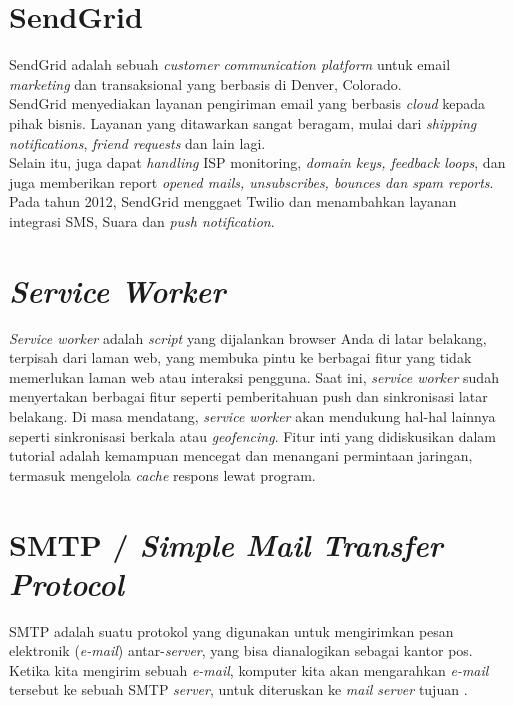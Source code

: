 	\section{  SendGrid}
	SendGrid adalah sebuah \textit{customer communication platform} untuk email \textit{marketing} dan transaksional yang berbasis di Denver, Colorado.
	\\ \indent
	SendGrid menyediakan layanan pengiriman email yang berbasis \textit{cloud} kepada pihak bisnis. Layanan yang ditawarkan sangat beragam, mulai dari \textit{shipping notifications}, \textit{friend requests} dan lain lagi. \\ \indent
	Selain itu, juga dapat \textit{handling} ISP monitoring, \textit{domain keys, feedback loops}, dan juga memberikan report \textit{opened mails, unsubscribes, bounces dan spam reports}. Pada tahun 2012, SendGrid menggaet Twilio dan menambahkan layanan integrasi SMS, Suara dan \textit{push notification}. \cite{wikipedia_sendgrid_2017}
	
	\section{  \textit{Service Worker}}
	\textit{Service worker }adalah \textit{script} yang dijalankan browser Anda di latar belakang, terpisah dari laman web, yang membuka pintu ke berbagai fitur yang tidak memerlukan laman web atau interaksi pengguna. Saat ini, \textit{service worker} sudah menyertakan berbagai fitur seperti pemberitahuan push dan sinkronisasi latar belakang. Di masa mendatang, \textit{service worker} akan mendukung hal-hal lainnya seperti sinkronisasi berkala atau \textit{geofencing}. Fitur inti yang didiskusikan dalam tutorial adalah kemampuan mencegat dan menangani permintaan jaringan, termasuk mengelola \textit{cache} respons lewat program\cite{google_developers_service_2017}.
	
	\section{  SMTP / \textit{Simple Mail Transfer Protocol}}
	SMTP adalah suatu protokol yang digunakan untuk mengirimkan pesan elektronik (\textit{e-mail}) antar-\textit{server}, yang bisa dianalogikan sebagai kantor pos. Ketika kita mengirim sebuah \textit{e-mail}, komputer kita akan mengarahkan \textit{e-mail} tersebut ke sebuah SMTP \textit{server}, untuk diteruskan ke \textit{mail server} tujuan \cite{noauthor_smtp_nodate}. 
	
